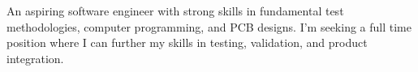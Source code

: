 \documentclass[class=article, crop=false]{standalone}
\begin{document}
\begin{centering}
An aspiring software engineer with strong skills in fundamental test methodologies, 
computer programming, and PCB designs. I'm seeking a full time position 
where I can further my skills in testing, validation, and 
product integration.
\end{centering}
\end{document}
